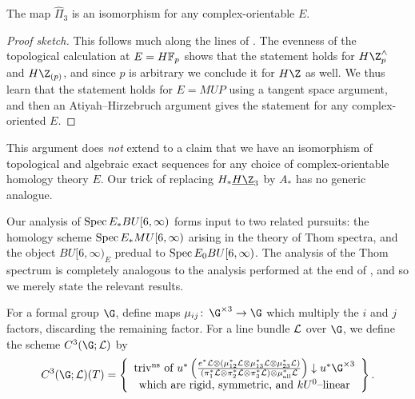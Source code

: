 \begin{corollary}\label{Pi3ForCplxOrientableE}
The map \(\hat \Pi_3\) is an isomorphism for any complex-orientable \(E\).
\end{corollary}
\begin{proof}[Proof sketch]
This follows much along the lines of .  The evenness of the topological calculation at \(E = \HFp\) shows that the statement holds for \(H\Z^\wedge_p\) and \(H\Z_{(p)}\), and since \(p\) is arbitrary we conclude it for \(H\Z\) as well.  We thus learn that the statement holds for \(E = MUP\) using a tangent space argument, and then an Atiyah--Hirzebruch argument gives the statement for any complex-oriented \(E\).
\end{proof}

\begin{remark}
This argument does \emph{not} extend to a claim that we have an isomorphism of topological and algebraic exact sequences for any choice of complex-orientable homology theory \(E\).  Our trick of replacing \(H_* \OS{H\Z}{3}\) by \(A_*\) has no generic analogue.
\end{remark}

Our analysis of \(\operatorname{Spec} E_* BU[6, \infty)\) forms input to two related pursuits: the homology scheme \(\operatorname{Spec} E_* MU[6, \infty)\) arising in the theory of Thom spectra, and the object \(BU[6, \infty)_E\) predual to \(\operatorname{Spec} E_0 BU[6, \infty)\).  The analysis of the Thom spectrum is completely analogous to the analysis performed at the end of , and so we merely state the relevant results.

\begin{definition}
For a formal group \(\G\), define maps \(\mu_{ij}\co \G^{\times 3} \to \G\) which multiply the \(i\){\th} and \(j\){\th} factors, discarding the remaining factor.  For a line bundle \(\mathcal{L}\) over \(\G\), we define the scheme \(C^3(\G; \sheaf L)\) by \[C^3(\G; \sheaf L)(T) = \left\{\begin{array}{c}\text{triv\textsuperscript{ns} of \(u^*\left(\frac{e^* \sheaf L \otimes (\mu_{12}^* \sheaf L \otimes \mu_{13}^* \sheaf L \otimes \mu_{23}^* \sheaf L)}{(\pi_1^* \sheaf L \otimes \pi_2^* \sheaf L \otimes \pi_3^* \sheaf L) \otimes \mu_{\mathrm{all}}^* \sheaf L}\right) \downarrow u^* \G^{\times 3}\)} \\ \text{which are rigid, symmetric, and \(kU^0\)--linear} \end{array}\right\}.\]
\end{definition}

